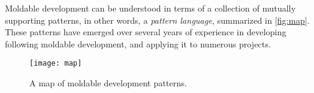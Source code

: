 \documentclass[acmsmall,screen,authorversion,nonacm]{acmart} %
\newcommand\kh[1]{\nbc{Konrad}{#1}{violet}}
\newcommand\eog[1]{\nbc{Edward}{#1}{purple}}
\newcommand\cp[1]{\nbe{Cesare}{#1}{olive}} %
\newcommand\dd[1]{\nbe{Daniel}{#1}{magenta}} %
\newcommand\ws[1]{\nbe{Workshop}{#1}{teal}} %
\newcommand{\GT}{\lst{GT}\xspace} %
\begin{document}

Moldable development can be understood in terms of a collection of mutually supporting 
patterns, in other words, a \emph{pattern language}, summarized in \autoref{fig:map}.
These patterns have emerged over several years of experience in developing \GT following moldable development, and applying it to numerous projects.

\begin{figure}[h]
  \texttt{[image: map]}
  \caption{A map of moldable development patterns.
  }
  \label{fig:map}
\end{figure}




\end{document}
